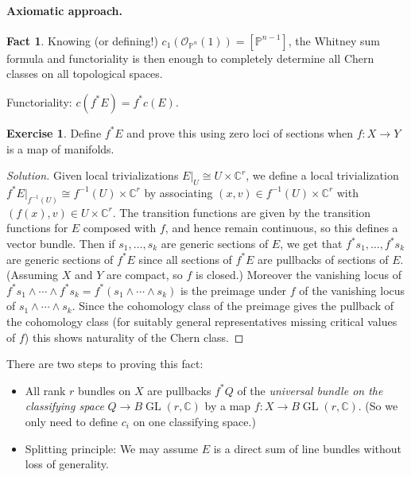 \documentclass{article}
\theoremstyle{definition}
\newtheorem*{fact}{Fact}
\newtheorem*{exercise}{Exercise}
\DeclareMathOperator{\GL}{GL}
\renewcommand{\O}{\mathcal{O}}
\renewcommand{\P}{\mathbb{P}}
\newcommand{\C}{\mathbb{C}}
\begin{document}
\paragraph{Axiomatic approach.}

\begin{fact}
    Knowing (or defining!) $c_1(\O_{\P^n}(1))=[\P^{n-1}]$, the Whitney sum
    formula and functoriality is then enough to completely determine all Chern
    classes on all topological spaces.
\end{fact}

Functoriality: $c(f^*E)=f^*c(E)$.

\begin{exercise}
    Define $f^*E$ and prove this using zero loci of sections when $f:X\to Y$ is
    a map of manifolds.
\end{exercise}

\begin{proof}[Solution]
    Given local trivializations $E|_U\cong U\times\C^r$, we define a local
    trivialization $f^*E|_{f^{-1}(U)}\cong f^{-1}(U)\times\C^r$ by associating
    $(x,v)\in f^{-1}(U)\times\C^r$ with $(f(x),v)\in U\times\C^r$. The
    transition functions are given by the transition functions for $E$ composed
    with $f$, and hence remain continuous, so this defines a vector bundle. Then
    if $s_1,\ldots,s_k$ are generic sections of $E$, we get that
    $f^*s_1,\ldots,f^*s_k$ are generic sections of $f^*E$ since all sections of
    $f^*E$ are pullbacks of sections of $E$. (Assuming $X$ and $Y$ are compact,
    so $f$ is closed.) Moreover the vanishing locus of
    $f^*s_1\wedge\cdots\wedge f^*s_k=f^*(s_1\wedge\cdots\wedge s_k)$ is the
    preimage under $f$ of the vanishing locus of $s_1\wedge\cdots\wedge s_k$.
    Since the cohomology class of the preimage gives the pullback of the
    cohomology class (for suitably general representatives missing critical
    values of $f$) this shows naturality of the Chern class.
\end{proof}

There are two steps to proving this fact:
\begin{itemize}
    \item All rank $r$ bundles on $X$ are pullbacks $f^*Q$ of the
        \emph{universal bundle on the classifying space} $Q\to B\GL(r,\C)$ by a
        map $f:X\to B\GL(r,\C)$. (So we only need to define $c_i$ on one
        classifying space.)

    \item Splitting principle: We may assume $E$ is a direct sum of line bundles
        without loss of generality.
\end{itemize}
\end{document}
